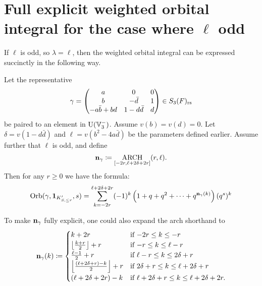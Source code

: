\section{Full explicit weighted orbital integral for the case where $\ell$ odd}
If $\ell$ is odd, so $\lambda = \ell$, then
the weighted orbital integral can be expressed succinctly in the following way.
\begin{theorem}
  \label{thm:full_orbital_ell_odd}
  Let the representative
  \[ \gamma = \begin{pmatrix}
      a & 0 & 0 \\
      b & - \bar d & 1 \\
      -a \bar b + b d & 1 - d \bar d & d
    \end{pmatrix} \in S_3(F)_{\mathrm{rs}} \]
  be paired to an element in $\operatorname{U}(\mathbb V_3^-)$.
  Assume $v(b) = v(d) = 0$.
  Let $\delta = v(1 - d \bar d)$
  and $\ell = v(b^2 - 4 a \bar d)$ be the parameters defined earlier.
  Assume further that $\ell$ is odd, and define
  \[ \mathbf n_\gamma \coloneqq \operatorname*{ARCH}_{[-2r, \ell + 2\delta + 2r]}(r, \ell). \]
  Then for any $r \ge 0$ we have the formula:
  \[
    \operatorname{Orb}(\gamma, \mathbf{1}_{K'_{S, \le r}}, s)
    = \sum_{k = -2r}^{\ell + 2\delta + 2r}
    (-1)^k \left( 1 + q + q^2 + \dots + q^{\mathbf n_{\gamma}(k)}  \right) (q^s)^k
  \]
\end{theorem}
\begin{remark}
  To make $\mathbf n_\gamma$ fully explicit, one could also expand the arch shorthand to
  \[
    \mathbf n_\gamma(k)
    \coloneqq \begin{cases}
      k + 2r & \text{if } {-2r} \le k \le -r \\
      \left\lfloor \frac{k+r}{2} \right\rfloor + r & \text{if }{-r} \le k \le \ell-r \\
      \frac{\ell-1}{2} + r & \text{if } \ell - r \le k \le 2\delta + r \\
      \left\lfloor \frac{(\ell+2\delta+r)-k}{2} \right\rfloor + r & \text{if } 2\delta + r \le k \le \ell + 2\delta + r\\
      (\ell + 2\delta + 2r) - k & \text{if } \ell + 2\delta + r \le k \le \ell + 2\delta + 2r.
    \end{cases} \]
\end{remark}

